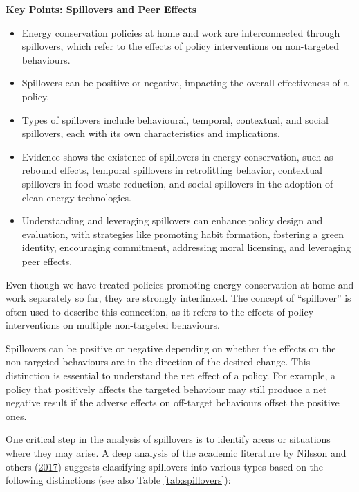 \documentclass[
  12pt,
  captions=heading]{scrreport}
\begin{document}
\begin{tcolorbox}[colback=yellow!10,colframe=black]
\textbf{Key Points: Spillovers and Peer Effects}
\begin{itemize}[leftmargin=*,labelsep=5mm]
    \item Energy conservation policies at home and work are interconnected through spillovers, which refer to the effects of policy interventions on non-targeted behaviours.
    \item Spillovers can be positive or negative, impacting the overall effectiveness of a policy.
    \item Types of spillovers include behavioural, temporal, contextual, and social spillovers, each with its own characteristics and implications.
    \item Evidence shows the existence of spillovers in energy conservation, such as rebound effects, temporal spillovers in retrofitting behavior, contextual spillovers in food waste reduction, and social spillovers in the adoption of clean energy technologies.
    \item Understanding and leveraging spillovers can enhance policy design and evaluation, with strategies like promoting habit formation, fostering a green identity, encouraging commitment, addressing moral licensing, and leveraging peer effects.
\end{itemize}
\end{tcolorbox}

Even though we have treated policies promoting energy conservation at
home and work separately so far, they are strongly interlinked. The
concept of ``spillover'' is often used to describe this connection, as
it refers to the effects of policy interventions on multiple
non-targeted behaviours.

Spillovers can be positive or negative depending on whether the effects
on the non-targeted behaviours are in the direction of the desired
change. This distinction is essential to understand the net effect of a
policy. For example, a policy that positively affects the targeted
behaviour may still produce a net negative result if the adverse effects
on off-target behaviours offset the positive ones.

One critical step in the analysis of spillovers is to identify areas or
situations where they may arise. A deep analysis of the academic
literature by Nilsson and others
(\protect\hyperlink{ref-nilsson2017spillover}{2017}) suggests
classifying spillovers into various types based on the following
distinctions (see also Table \ref{tab:spillovers}):
\end{document}
